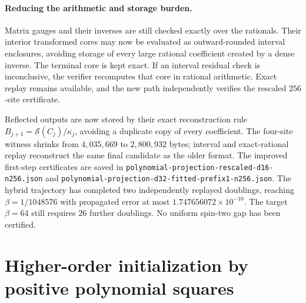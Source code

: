 \documentclass[11pt]{article}
\begin{document}
\paragraph{Reducing the arithmetic and storage burden.}
Matrix gauges and their inverses are still checked exactly over the
rationals. Their interior transformed cores may now be evaluated as
outward-rounded interval enclosures, avoiding storage of every large
rational coefficient created by a dense inverse. The terminal core is
kept exact. If an interval residual check is inconclusive, the verifier
recomputes that core in rational arithmetic. Exact replay remains
available, and the new path independently verifies the rescaled
$256$-site certificate.

Reflected outputs are now stored by their exact reconstruction rule
$B_{j+1}=\mathcal S(C_j)/\kappa_j$, avoiding a duplicate copy of every
coefficient. The four-site witness shrinks from $4{,}035{,}669$ to
$2{,}800{,}932$ bytes; interval and exact-rational replay reconstruct
the same final candidate as the older format. The improved first-step
certificates are saved in
\texttt{polynomial-projection-rescaled-d16-n256.json} and
\texttt{polynomial-projection-d32-fitted-prefix1-n256.json}.
The hybrid trajectory has completed two independently replayed doublings,
reaching $\beta=1/1048576$ with propagated error at most
$1.747656072\times10^{-10}$. The target $\beta=64$ still requires
$26$ further doublings.
No uniform spin-two gap has been certified.

\section{Higher-order initialization by positive polynomial squares}
\end{document}
